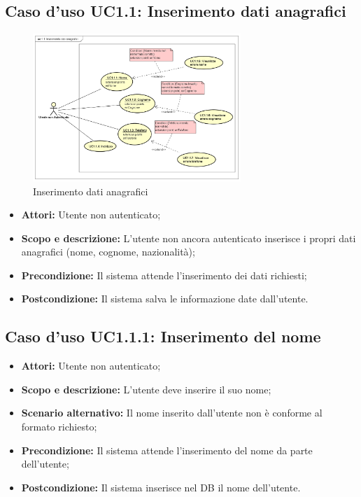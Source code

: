 \documentclass[12pt,a4paper,titlepage]{article}
\begin{document}
	\subsection{Caso d'uso UC1.1: Inserimento dati anagrafici}
	\label{UC1.1}
	\begin{figure}[ht]
		\centering
		\includegraphics[width=0.7\textwidth]{UseCase/InserimentoDatiAnagrafici}
		\caption{Inserimento dati anagrafici}
	\end{figure}
	\begin{itemize}
		\item \textbf{Attori:} Utente non autenticato;
		\item \textbf{Scopo e descrizione:} L'utente non ancora autenticato inserisce i propri dati anagrafici (nome, cognome, nazionalità);
		\item \textbf{Precondizione:} Il sistema attende l'inserimento dei dati richiesti;
		\item \textbf{Postcondizione:} Il sistema salva le informazione date dall'utente.
	\end{itemize}
	\subsection{Caso d'uso UC1.1.1: Inserimento del nome}
	\label{UC1.1.1}
	\begin{itemize}
		\item \textbf{Attori:} Utente non autenticato; 
		\item \textbf{Scopo e descrizione:} L'utente deve inserire il suo nome;
		\item \textbf{Scenario alternativo:} Il nome inserito dall'utente non è conforme al formato richiesto;
		\item \textbf{Precondizione:} Il sistema attende l'inserimento del nome da parte dell'utente;
		\item \textbf{Postcondizione:} Il sistema inserisce nel DB il nome dell'utente.
	\end{itemize}
\end{document}
